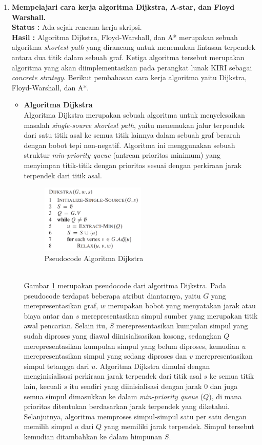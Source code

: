\documentclass[a4paper,twoside]{article}
\begin{document}
\begin{enumerate}
		\item \textbf{Mempelajari cara kerja algoritma Dijkstra, A-star, dan Floyd Warshall.}\\
		{\bf Status :} Ada sejak rencana kerja skripsi.\\
		{\bf Hasil :} Algoritma Dijkstra, Floyd-Warshall, dan A* merupakan sebuah algoritma \textit{shortest path} yang dirancang untuk menemukan lintasan terpendek antara dua titik dalam sebuah graf. Ketiga algoritma tersebut merupakan algoritma yang akan diimplementasikan pada perangkat lunak KIRI sebagai \textit{concrete strategy}. Berikut pembahasan cara kerja algoritma yaitu Dijkstra, Floyd-Warshall, dan A*.
        \newpage
        \begin{itemize}
            \item \textbf{Algoritma Dijkstra}
            \\ Algoritma Dijkstra merupakan sebuah algoritma untuk menyelesaikan masalah \textit{single-source shortest path}, yaitu menemukan jalur terpendek dari satu titik asal ke semua titik lainnya dalam sebuah graf berarah dengan bobot tepi non-negatif. Algoritma ini menggunakan sebuah struktur \textit{min-priority queue} (antrean prioritas minimum) yang menyimpan titik-titik dengan prioritas sesuai dengan perkiraan jarak terpendek dari titik asal.
            \begin{figure}[H] 
            	\centering  
            	\includegraphics[width=0.5\textwidth]{Gambar/dijkstra.png}  
            	\caption{Pseudocode Algoritma Dijkstra}
            	\label{fig:pseudocodedijkstra} 
            \end{figure}
            \noindent
            \\
            Gambar \ref{fig:pseudocodedijkstra} merupakan pseudocode dari algoritma Dijkstra. Pada pseudocode terdapat beberapa atribut diantarnya, yaitu $G$ yang merepresentasikan graf, $w$ merupakan bobot yang menyatakan jarak atau biaya antar dan $s$ merepresentasikan simpul sumber yang merupakan titik awal pencarian. Selain itu, $S$ merepresentasikan kumpulan simpul yang sudah diproses yang diawal diinisialisasikan kosong, sedangkan $Q$ merepresentasikan kumpulan simpul yang belum diproses, kemudian $u$ merepresentasikan simpul yang sedang diproses dan $v$ merepresentasikan simpul tetangga dari $u$. Algoritma Dijkstra dimulai dengan menginisialisasi perkiraan jarak terpendek dari titik asal $s$ ke semua titik lain, kecuali $s$ itu sendiri yang diinisialisasi dengan jarak 0 dan juga semua simpul dimasukkan ke dalam \textit{min-priority queue} ($Q$), di mana prioritas ditentukan berdasarkan jarak terpendek yang diketahui. Selanjutnya, algoritma memproses simpul-simpul satu per satu dengan memilih simpul $u$ dari $Q$ yang memiliki jarak terpendek. Simpul tersebut kemudian ditambahkan ke dalam himpunan $S$.

\end{itemize}
\end{enumerate}
\end{document}
